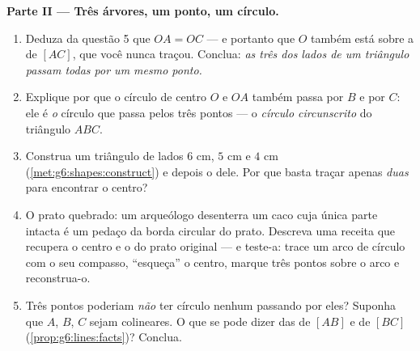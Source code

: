 \begin{problem}
\medskip
\noindent\textbf{Parte II --- Três árvores, um ponto, um círculo.}
\begin{enumerate}[resume]
  \item Deduza da questão 5 que $OA = OC$ --- e portanto que $O$
        também está sobre a  de $[AC]$, que você nunca
        traçou. Conclua: \emph{as três  dos lados de um
        triângulo passam todas por um mesmo ponto.}
  \item Explique por que o círculo de centro $O$ e  $OA$ também
        passa por $B$ e por $C$: ele é \emph{o} círculo que passa pelos
        três pontos --- o \emph{círculo
        circunscrito} do triângulo $ABC$.
  \item Construa um triângulo de lados $6$ cm, $5$ cm e $4$ cm
        (\cref{met:g6:shapes:construct}) e depois o  dele. Por que basta traçar apenas \emph{duas}
         para encontrar o centro?
  \item O prato quebrado: um arqueólogo desenterra um caco cuja única
        parte intacta é um pedaço da borda circular do prato. Descreva
        uma receita que recupera o centro e o  do prato original
        --- e teste-a: trace um arco de círculo com o seu compasso,
        ``esqueça'' o centro, marque três pontos sobre o arco e
        reconstrua-o.
  \item Três pontos poderiam \emph{não} ter círculo nenhum passando
        por eles? Suponha que $A$, $B$, $C$ sejam colineares. O que se
        pode dizer das  de $[AB]$ e de $[BC]$
        (\cref{prop:g6:lines:facts})? Conclua.
\end{enumerate}


\end{problem}

